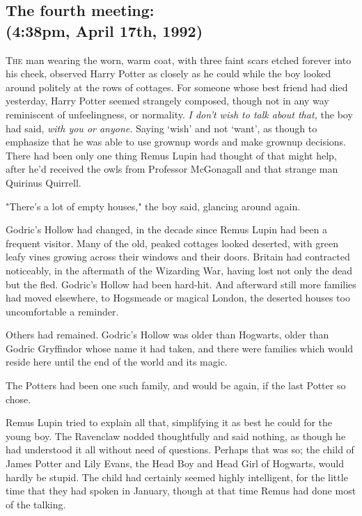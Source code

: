 
\subsection{The fourth meeting:\\
(4:38pm, April 17th, 1992)}

\lettrine{T}{he} man wearing the worn, warm coat, with three faint scars etched forever into 
his cheek, observed Harry Potter as closely as he could while the boy looked 
around politely at the rows of cottages. For someone whose best friend had died 
yesterday, Harry Potter seemed strangely composed, though not in any way 
reminiscent of unfeelingness, or normality. \emph{I don't wish to talk about 
that,} the boy had said, \emph{with you or anyone.} Saying `wish' and not 
`want', as though to emphasize that he was able to use grownup words and make 
grownup decisions. There had been only one thing Remus Lupin had thought of 
that might help, after he'd received the owls from Professor McGonagall and 
that strange man Quirinus Quirrell.

"There's a lot of empty houses," the boy said, glancing around again.

Godric's Hollow had changed, in the decade since Remus Lupin had been a 
frequent visitor. Many of the old, peaked cottages looked deserted, with green 
leafy vines growing across their windows and their doors. Britain had 
contracted noticeably, in the aftermath of the Wizarding War, having lost not 
only the dead but the fled. Godric's Hollow had been hard-hit. And afterward 
still more families had moved elsewhere, to Hogsmeade or magical London, the 
deserted houses too uncomfortable a reminder.

Others had remained. Godric's Hollow was older than Hogwarts, older than Godric 
Gryffindor whose name it had taken, and there were families which would reside 
here until the end of the world and its magic.

The Potters had been one such family, and would be again, if the last Potter so 
chose.

Remus Lupin tried to explain all that, simplifying it as best he could for the 
young boy. The Ravenclaw nodded thoughtfully and said nothing, as though he had 
understood it all without need of questions. Perhaps that was so; the child of 
James Potter and Lily Evans, the Head Boy and Head Girl of Hogwarts, would 
hardly be stupid. The child had certainly seemed highly intelligent, for the 
little time that they had spoken in January, though at that time Remus had done 
most of the talking.

